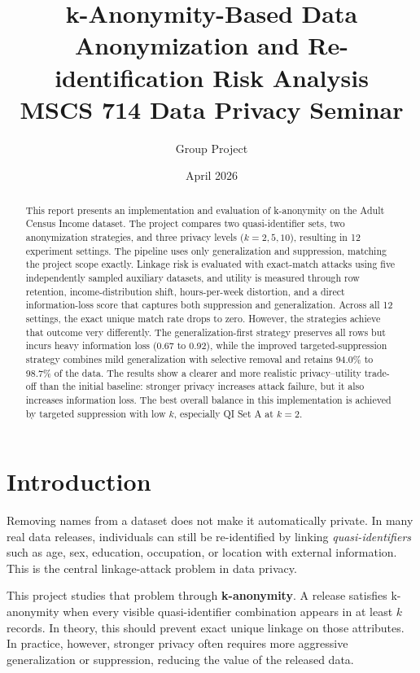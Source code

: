 \documentclass[11pt]{article}
\title{\textbf{k-Anonymity-Based Data Anonymization and Re-identification Risk Analysis}\\
\large MSCS 714 Data Privacy Seminar}
\author{Group Project}
\date{April 2026}
\begin{document}
\maketitle

\begin{abstract}
This report presents an implementation and evaluation of k-anonymity on the Adult Census Income dataset. The project compares two quasi-identifier sets, two anonymization strategies, and three privacy levels ($k=2,5,10$), resulting in 12 experiment settings. The pipeline uses only generalization and suppression, matching the project scope exactly. Linkage risk is evaluated with exact-match attacks using five independently sampled auxiliary datasets, and utility is measured through row retention, income-distribution shift, hours-per-week distortion, and a direct information-loss score that captures both suppression and generalization. Across all 12 settings, the exact unique match rate drops to zero. However, the strategies achieve that outcome very differently. The generalization-first strategy preserves all rows but incurs heavy information loss (0.67 to 0.92), while the improved targeted-suppression strategy combines mild generalization with selective removal and retains 94.0\% to 98.7\% of the data. The results show a clearer and more realistic privacy--utility trade-off than the initial baseline: stronger privacy increases attack failure, but it also increases information loss. The best overall balance in this implementation is achieved by targeted suppression with low $k$, especially QI Set A at $k=2$.
\end{abstract}

\section{Introduction}
Removing names from a dataset does not make it automatically private. In many real data releases, individuals can still be re-identified by linking \textit{quasi-identifiers} such as age, sex, education, occupation, or location with external information. This is the central linkage-attack problem in data privacy.

This project studies that problem through \textbf{k-anonymity}. A release satisfies k-anonymity when every visible quasi-identifier combination appears in at least $k$ records. In theory, this should prevent exact unique linkage on those attributes. In practice, however, stronger privacy often requires more aggressive generalization or suppression, reducing the value of the released data.
\end{document}
